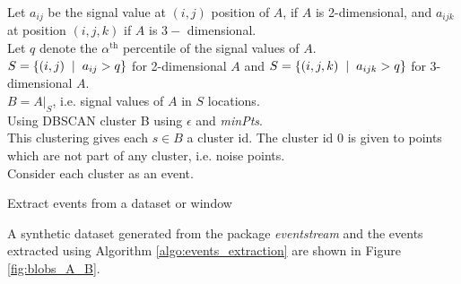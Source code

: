 \documentclass[11pt]{article}
\begin{document}
	 \DontPrintSemicolon
	 \begin{algorithm}[!ht]
	 	\footnotesize
	 	Let $a_{ij}$ be the signal value at $(i, j)$ position of $A$, if $A$ is 2-dimensional, and $a_{ijk}$  at position $(i, j, k)$ if $A$ is  $3-$ dimensional. \\
	 	Let $q$ denote the $\alpha^{\text{th}}$ percentile of the signal values of $A$. \\
	 	$S = \{ (i,j) \hspace{2mm} | \hspace{2mm} a_{ij} > q  \} $ for 2-dimensional $A$ and 
	 	$S = \{ (i,j, k) \hspace{2mm} | \hspace{2mm} a_{ijk} > q  \} $ for 3-dimensional $A$. \\
	 	$ B = A|_S$, i.e. signal values of $A$ in $S$ locations. \\
	 	Using DBSCAN cluster B using $\epsilon$ and {\it minPts}. \\
	 	This clustering gives each $s \in B$ a cluster id. The cluster id $0$ is given to points which are not part of any cluster, i.e. noise points. \\
	 	
	 	Consider each cluster as an event. \, 
	 	\caption{\footnotesize Extract events from a dataset or window}
	 	\label{algo:events_extraction}
	 \end{algorithm}
	 
	 A synthetic dataset generated from the package {\it eventstream} and the events extracted using Algorithm \ref{algo:events_extraction} are shown in Figure \ref{fig:blobs_A_B}. 
	 
\end{document}
